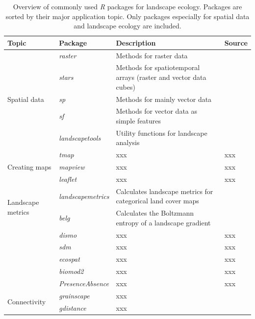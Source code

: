 \documentclass[smallextended]{svjour3}       %
\begin{document}
\begin{landscape}

  \begin{table}
    \begin{tabularx}{0.9\linewidth}{XXXX}
      \caption{Overview of commonly used \textit{R} packages for landscape ecology. Packages are sorted by their major application topic. Only packages especially for spatial data and landscape ecology are included.} \\
      \hline
      Topic & Package & Description & Source \\
      \hline
      \multirow{5}{*}{Spatial data} & \textit{raster} & Methods for raster data & \cite{Hijmans2019} \\
      & \textit{stars} & Methods for spatiotemporal arrays (raster and vector data cubes) & \cite{Pebesma2019} \\
      & \textit{sp} & Methods for mainly vector data & \cite{Pebesma2005,Bivand2013} \\
      & \textit{sf} & Methods for vector data as simple features & \cite{Pebesma2018} \\
      & \textit{landscapetools} & Utility functions for landscape analysis & \cite{Sciaini2018} \\
      \hline
      \multirow{3}{*}{Creating maps} & \textit{tmap} & xxx & xxx \\
      & \textit{mapview} & xxx & xxx \\
      & \textit{leaflet} & xxx & xxx \\
      \hline
      \multirow{2}{*}{Landscape metrics} & \textit{landscapemetrics} & Calculates landscape metrics for categorical land cover maps & \cite{Hesselbarth2019a} \\
      & \textit{belg} & Calculates the Boltzmann entropy of a landscape gradient & \cite{R-belgpaper} \\
      \hline
      \multirow{5}{*}{}Species distribution modeling (SDM) & \textit{dismo} & xxx & xxx \\
      & \textit{sdm} & xxx & xxx \\
      & \textit{ecospat} & xxx & xxx \\
      & \textit{biomod2} & xxx & xxx \\
      & \textit{PresenceAbsence} & xxx & xxx \\
      \hline
      \multirow{3}{*}{Connectivity} & \textit{grainscape} & xxx & \cite{Chubaty2020} \\
      & \textit{gdistance} & xxx & \cite{vanEtten2017} \\

\end{tabularx}
\end{table}
\end{landscape}
\end{document}
